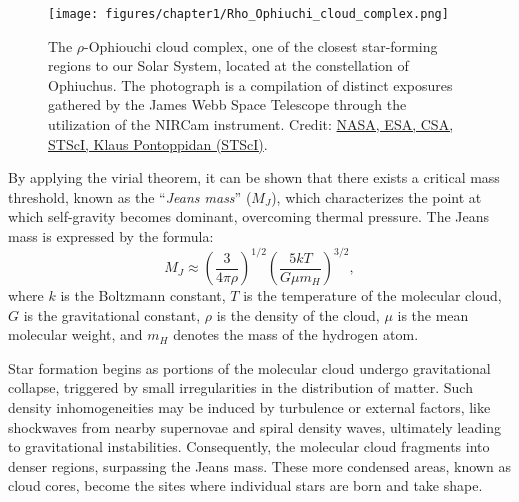 \documentclass[main.tex]{subfiles}
\begin{document}
    \begin{figure}[t]
        \centering
        \texttt{[image: figures/chapter1/Rho\_Ophiuchi\_cloud\_complex.png]}
        \caption{The $\rho$-Ophiouchi cloud complex, one of the closest star-forming regions to our Solar System, located at the constellation of Ophiuchus. The photograph is a compilation of distinct exposures gathered by the James Webb Space Telescope through the utilization of the NIRCam instrument. Credit: \href{https://webbtelescope.org/contents/media/images/2023/128/01H449193V5Q4Q6GFBKXAZ3S03}{NASA, ESA, CSA, STScI, Klaus Pontoppidan (STScI)}.}
        \label{fig:rho_ophiouchi}
    \end{figure}

    By applying the virial theorem, it can be shown that there exists a critical mass threshold, known as the ``\textit{Jeans mass}'' ($M_J$), which characterizes the point at which self-gravity becomes dominant, overcoming thermal pressure. The Jeans mass is expressed by the formula:
    \begin{equation}\label{eq:jeans_mass}
        M_J \approx \left(\frac{3}{4\pi \rho}\right)^{1/2} \left(\frac{5kT}{G\mu m_H }\right)^{3/2}, 
    \end{equation}
    where $k$ is the Boltzmann constant, $T$ is the temperature of the molecular cloud, $G$ is the gravitational constant, $\rho$ is the density of the cloud, $\mu$ is the mean molecular weight, and $m_H$ denotes the mass of the hydrogen atom.

    Star formation begins as portions of the molecular cloud undergo gravitational collapse, triggered by small irregularities in the distribution of matter. Such density inhomogeneities may be induced by turbulence or external factors, like shockwaves from nearby supernovae and spiral density waves, ultimately leading to gravitational instabilities. Consequently, the molecular cloud fragments into denser regions, surpassing the Jeans mass. These more condensed areas, known as cloud cores, become the sites where individual stars are born and take shape.
\end{document}
